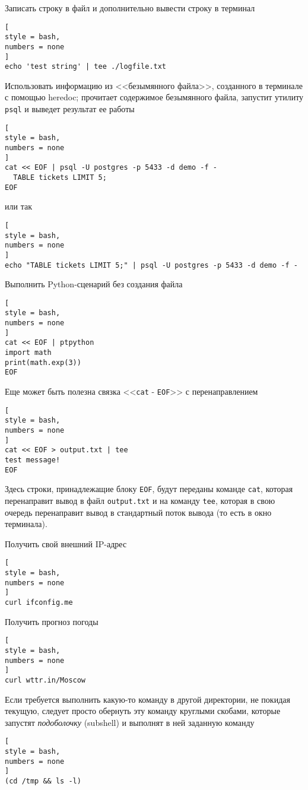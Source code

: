 \documentclass[%
	11pt,
	a4paper,
	utf8,
		]{article}
\begin{document}
Записать строку в файл и дополнительно вывести строку в терминал
\begin{lstlisting}[
style = bash,
numbers = none
]
echo 'test string' | tee ./logfile.txt
\end{lstlisting}

Использовать информацию из <<безымянного файла>>, созданного в терминале с помощью heredoc; прочитает содержимое безымянного файла, запустит утилиту \texttt{psql} и выведет результат ее работы
\begin{lstlisting}[
style = bash,
numbers = none	
]
cat << EOF | psql -U postgres -p 5433 -d demo -f -
  TABLE tickets LIMIT 5;
EOF
\end{lstlisting}
или так
\begin{lstlisting}[
style = bash,
numbers = none
]
echo "TABLE tickets LIMIT 5;" | psql -U postgres -p 5433 -d demo -f -
\end{lstlisting}

Выполнить Python-сценарий без создания файла
\begin{lstlisting}[
style = bash,
numbers = none
]
cat << EOF | ptpython
import math
print(math.exp(3))
EOF
\end{lstlisting}

Еще может быть полезна связка <<\texttt{cat} - \texttt{EOF}>> с перенаправлением
\begin{lstlisting}[
style = bash,
numbers = none	
]
cat << EOF > output.txt | tee
test message!
EOF
\end{lstlisting}
Здесь строки, принадлежащие блоку \texttt{EOF}, будут переданы команде \texttt{cat}, которая перенаправит вывод в файл \texttt{output.txt} и на команду \texttt{tee}, которая в свою очередь перенаправит вывод в стандартный поток вывода (то есть в окно терминала).

Получить свой внешний IP-адрес
\begin{lstlisting}[
style = bash,
numbers = none	
]
curl ifconfig.me
\end{lstlisting}

Получить прогноз погоды
\begin{lstlisting}[
style = bash,
numbers = none	
]
curl wttr.in/Moscow
\end{lstlisting}

Если требуется выполнить какую-то команду в другой директории, не покидая текущую, следует просто обернуть эту команду круглыми скобами, которые запустят \emph{подоболочку} (subshell) и выполнят в ней заданную команду
\begin{lstlisting}[
style = bash,
numbers = none	
]
(cd /tmp && ls -l)
\end{lstlisting}
\end{document}
